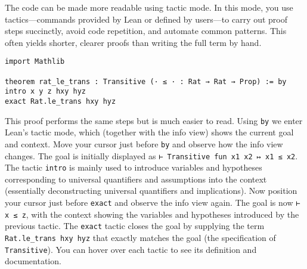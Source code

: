 \begin{example}
  The code can be made more readable using tactic mode.
  In this mode, you use tactics—commands provided by Lean or defined by users—to
  carry out proof steps succinctly, avoid code repetition,
  and automate common patterns.
  This often yields shorter, clearer proofs than writing the full term by hand.
  \begin{lstlisting}[language=lean]
import Mathlib

theorem rat_le_trans : Transitive (· ≤ · : Rat → Rat → Prop) := by
intro x y z hxy hyz
exact Rat.le_trans hxy hyz
\end{lstlisting}
  This proof performs the same steps but is much easier to read.
  Using \lstinline[language=lean]|by| we enter Lean's tactic mode,
  which (together with the info view)
  shows the current goal and context.
  Move your cursor just before \lstinline[language=lean]|by|
  and observe how the info view changes.
  The goal is initially displayed as \lstinline[language=lean]|⊢ Transitive fun x1 x2 ↦ x1 ≤ x2|.
  The tactic \lstinline[language=lean]|intro| is mainly used to introduce
  variables and hypotheses corresponding to universal quantifiers
  and assumptions into the context (essentially deconstructing universal quantifiers and implications).
  Now position your cursor just before \lstinline[language=lean]|exact|
  and observe the info view again.
  The goal is now \lstinline[language=lean]|⊢ x ≤ z|, with the context
  showing the variables and hypotheses introduced by the previous tactic.
  The \lstinline[language=lean]|exact| tactic closes the goal
  by supplying the term \lstinline[language=lean]|Rat.le_trans hxy hyz| that exactly matches the goal
  (the specification of \lstinline[language=lean]|Transitive|).
  You can hover over each tactic to see its definition and documentation.
\end{example}
